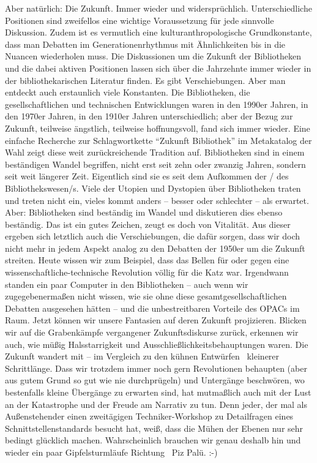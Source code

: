 \documentclass[a4paper,
fontsize=11pt,
oneside,
numbers=noperiodatend,
parskip=half-,
bibliography=totoc,
final
]{scrartcl}
\begin{document}
Aber natürlich: Die Zukunft. Immer wieder und widersprüchlich.
Unterschiedliche Positionen sind zweifellos eine wichtige Voraussetzung
für jede sinnvolle Diskussion. Zudem ist es vermutlich eine
kulturanthropologische Grundkonstante, dass man Debatten im
Generationenrhythmus mit Ähnlichkeiten bis in die Nuancen wiederholen
muss. Die Diskussionen um die Zukunft der Bibliotheken und die dabei
aktiven Positionen lassen sich über die Jahrzehnte immer wieder in der
bibliothekarischen Literatur finden. Es gibt Verschiebungen. Aber man
entdeckt auch erstaunlich viele Konstanten. Die Bibliotheken, die
gesellschaftlichen und technischen Entwicklungen waren in den 1990er
Jahren, in den 1970er Jahren, in den 1910er Jahren unterschiedlich; aber
der Bezug zur Zukunft, teilweise ängstlich, teilweise hoffnungsvoll,
fand sich immer wieder. Eine einfache Recherche zur Schlagwortkette
\enquote{Zukunft Bibliothek} im Metakatalog der Wahl zeigt diese weit
zurückreichende Tradition auf. Bibliotheken sind in einem beständigen
Wandel begriffen, nicht erst seit zehn oder zwanzig Jahren, sondern seit
weit längerer Zeit. Eigentlich sind sie es seit dem Aufkommen der / des
Bibliothekswesen/s. Viele der Utopien und Dystopien über Bibliotheken
traten und treten nicht ein, vieles kommt anders -- besser oder
schlechter -- als erwartet. Aber: Bibliotheken sind beständig im Wandel
und diskutieren dies ebenso beständig. Das ist ein gutes Zeichen, zeugt
es doch von Vitalität. Aus dieser ergeben sich letztlich auch die
Verschiebungen, die dafür sorgen, dass wir doch nicht mehr in jedem
Aspekt analog zu den Debatten der 1950er um die Zukunft streiten. Heute
wissen wir zum Beispiel, dass das Bellen für oder gegen eine
wissenschaftliche-technische Revolution völlig für die Katz war.
Irgendwann standen ein paar Computer in den Bibliotheken -- auch wenn
wir zugegebenermaßen nicht wissen, wie sie ohne diese
gesamtgesellschaftlichen Debatten ausgesehen hätten -- und die
unbestreitbaren Vorteile des OPACs im Raum. Jetzt können wir unsere
Fantasien auf deren Zukunft projizieren. Blicken wir auf die
Grabenkämpfe vergangener Zukunftsdiskurse zurück, erkennen wir auch, wie
müßig Halsstarrigkeit und Ausschließlichkeitsbehauptungen waren. Die
Zukunft wandert mit -- im Vergleich zu den kühnen Entwürfen~ kleinerer
Schrittlänge. Dass wir trotzdem immer noch gern Revolutionen behaupten
(aber aus gutem Grund so gut wie nie durchprügeln) und Untergänge
beschwören, wo bestenfalls kleine Übergänge zu erwarten sind, hat
mutmaßlich auch mit der Lust an der Katastrophe und der Freude am
Narrativ zu tun. Denn jeder, der mal als Außenstehender einen
zweitägigen Techniker-Workshop zu Detailfragen eines
Schnittstellenstandards besucht hat, weiß, dass die Mühen der Ebenen nur
sehr bedingt glücklich machen. Wahrscheinlich brauchen wir genau deshalb
hin und wieder ein paar Gipfelsturmläufe Richtung~ Piz Palü. :-)
\end{document}
